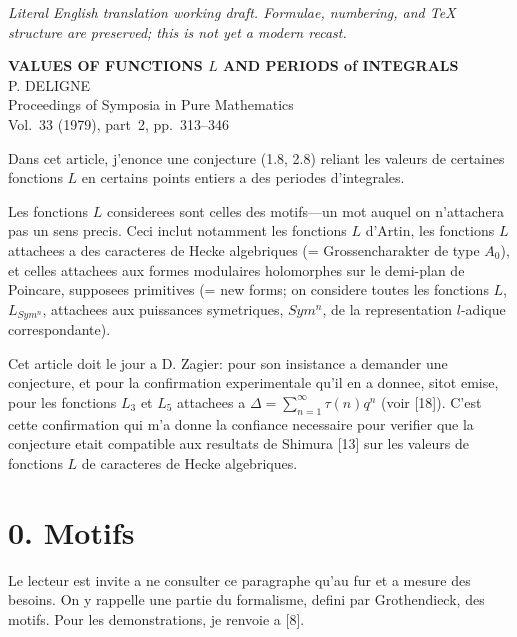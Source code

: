 \documentclass[12pt,a4paper]{article}
\theoremstyle{plain}
\theoremstyle{definition}
\theoremstyle{remark}
\begin{document}
\begin{center}\small\emph{Literal English translation working draft. Formulae, numbering, and TeX structure are preserved; this is not yet a modern recast.}\end{center}
\vspace{0.5em}


\thispagestyle{empty}

\begin{center}
{\large\bfseries VALUES OF FUNCTIONS $L$ AND PERIODS of INTEGRALS}\\[1em]
P. DELIGNE\\[1em]
Proceedings of Symposia in Pure Mathematics\\
Vol.~33 (1979), part~2, pp.~313--346
\end{center}

\vspace{1em}


Dans cet article, j'enonce une conjecture (1.8, 2.8) reliant les valeurs de
certaines fonctions $L$ en certains points entiers a des periodes d'integrales.

Les fonctions $L$ considerees sont celles des motifs---un mot auquel on n'attachera
pas un sens precis. Ceci inclut notamment les fonctions $L$ d'Artin, les fonctions $L$
attachees a des caracteres de Hecke algebriques (= Grossencharakter de type $A_0$),
et celles attachees aux formes modulaires holomorphes sur le demi-plan de Poincare,
supposees primitives (= new forms; on considere toutes les fonctions $L$,
$L_{Sym^n}$, attachees aux puissances symetriques, $Sym^n$, de la representation
$l$-adique correspondante).

Cet article doit le jour a D. Zagier: pour son insistance a demander une conjecture,
et pour la confirmation experimentale qu'il en a donnee, sitot emise, pour les
fonctions $L_3$ et $L_5$ attachees a $\Delta = \sum_{n=1}^{\infty} \tau(n)q^n$
(voir [18]). C'est cette confirmation qui m'a donne la confiance necessaire pour
verifier que la conjecture etait compatible aux resultats de Shimura [13] sur les
valeurs de fonctions $L$ de caracteres de Hecke algebriques.

\section*{0. Motifs}

Le lecteur est invite a ne consulter ce paragraphe qu'au fur et a mesure des besoins.
On y rappelle une partie du formalisme, defini par Grothendieck, des motifs. Pour les
demonstrations, je renvoie a [8].
\end{document}
